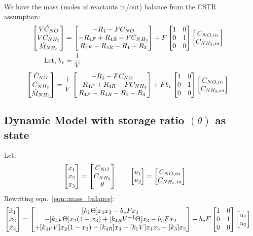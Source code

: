 We have the mass (moles of reactants in/out) balance from the CSTR assumption:
\begin{align*}
    \begin{bmatrix} V \dot C_{NO}\\ V \dot C_{NH_3} \\ \dot M_{NH_3}  \end{bmatrix} &=
    \begin{bmatrix} 
        -R_1 - F C_{NO}\\
        -R_{4F} + R_{4R} - F C_{NH_3}\\
        R_{4F} - R_{4R} - R_1 - R_3
     \end{bmatrix} +
    F \begin{bmatrix} 1 & 0 \\ 0 & 1 \\ 0 & 0 \end{bmatrix} \begin{bmatrix}  C_{NO, in} \\ C_{NH_3, in} \end{bmatrix}\\
    \text{Let, } b_v &= \frac{1}{V}\\
\end{align*}
\begin{equation} \label{eqn::mass_balance}
    \begin{bmatrix} \dot C_{NO} \\  \dot C_{NH_3} \\ \dot M_{NH_3}  \end{bmatrix} = \frac{1}{V}
    \begin{bmatrix} 
        -R_1 - F C_{NO}\\
        -R_{4F} + R_{4R} - F C_{NH_3}\\
        R_{4F} - R_{4R} - R_1 - R_3
     \end{bmatrix} +
    Fb_v \begin{bmatrix} 1 & 0 \\ 0 & 1 \\ 0 & 0 \end{bmatrix} \begin{bmatrix}  C_{NO, in} \\ C_{NH_3, in} \end{bmatrix}\\
\end{equation}

\subsection{Dynamic Model with storage ratio $(\theta)$ as state}
Let,
\begin{align*}
    \begin{bmatrix} x_1 \\ x_2 \\ x_3 \end{bmatrix} = \begin{bmatrix} C_{NO} \\ C_{NH_3} \\ \theta \end{bmatrix} \qquad &
    \begin{bmatrix} u_1 \\ u_2  \end{bmatrix} = \begin{bmatrix} C_{NO, in} \\ C_{NH_3, in} \end{bmatrix}
\end{align*}
Rewriting eqn.~\ref{eqn::mass_balance}:
\begin{equation}\label{eqn::3_state_theta}
    \begin{bmatrix} \dot x_1 \\ \dot x_2 \\ \dot x_3 \end{bmatrix} =
    \begin{bmatrix} [k_1 \Theta] x_1 x_3 - b_v F x_1 \\
        -[k_{4F} \Theta] x_2 (1-x_3) + [k_{4R} V^{-1} \Theta] x_3 - b_v F x_2 \\
        +[k_{4F}V] x_2 (1-x_3) - [k_{4R}] x_3 - [k_1 V] x_1 x_3 - [k_3 ] x_3 \end{bmatrix} +
    b_v F \begin{bmatrix} 1 & 0 \\ 0 & 1 \\ 0 & 0 \end{bmatrix} \begin{bmatrix} u_1 \\ u_2 \end{bmatrix}\\
\end{equation}

